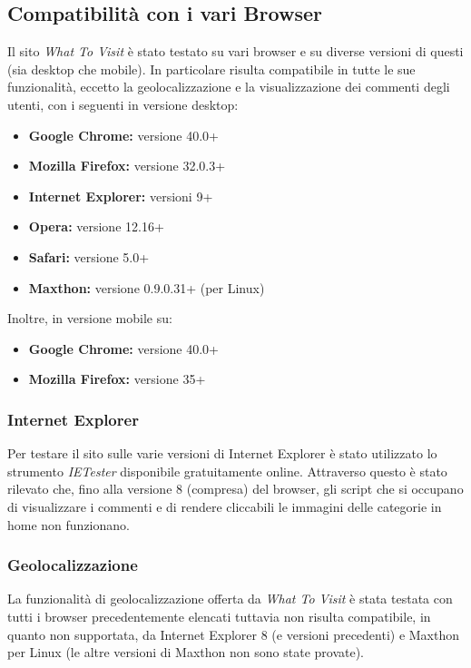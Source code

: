 \subsection{Compatibilità con i vari Browser}
Il sito \textit{What To Visit} è stato testato su vari browser e su
diverse versioni di questi (sia desktop che mobile). 
In particolare risulta compatibile in tutte le sue funzionalità, 
eccetto la geolocalizzazione e la visualizzazione dei commenti
degli utenti, con i seguenti in versione desktop:
\begin{itemize}
\item \textbf{Google Chrome:} versione 40.0+ 
\item \textbf{Mozilla Firefox:} versione 32.0.3+
\item \textbf{Internet Explorer:} versioni 9+
\item \textbf{Opera:} versione 12.16+
\item \textbf{Safari:} versione 5.0+
\item \textbf{Maxthon:} versione 0.9.0.31+ (per Linux)
\end{itemize}

Inoltre, in versione mobile su:
\begin{itemize}
\item \textbf{Google Chrome:} versione 40.0+ 
\item \textbf{Mozilla Firefox:} versione 35+  
\end{itemize}

\subsubsection{Internet Explorer}
Per testare il sito sulle varie versioni di Internet Explorer è stato utilizzato lo strumento
\textit{IETester} disponibile gratuitamente online. Attraverso questo è stato rilevato che, fino alla versione 8 (compresa) del browser, gli script che si occupano di visualizzare i commenti e di rendere cliccabili le immagini delle categorie in home non funzionano.

\subsubsection{Geolocalizzazione}
La funzionalità di geolocalizzazione offerta da \textit{What To Visit} è stata
testata con tutti i browser precedentemente elencati tuttavia non risulta compatibile,
in quanto non supportata, da Internet Explorer 8 (e versioni precedenti) e Maxthon per Linux (le altre versioni di Maxthon non sono state provate).

